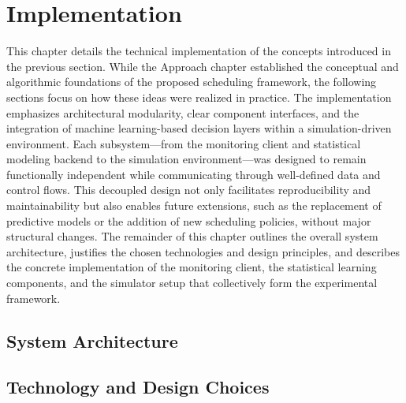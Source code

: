 \section{Implementation}
\label{cha:implementation}
This chapter details the technical implementation of the concepts introduced in the previous section. While the Approach chapter established the conceptual and algorithmic foundations of the proposed scheduling framework, the following sections focus on how these ideas were realized in practice. The implementation emphasizes architectural modularity, clear component interfaces, and the integration of machine learning-based decision layers within a simulation-driven environment. Each subsystem—from the monitoring client and statistical modeling backend to the simulation environment—was designed to remain functionally independent while communicating through well-defined data and control flows. This decoupled design not only facilitates reproducibility and maintainability but also enables future extensions, such as the replacement of predictive models or the addition of new scheduling policies, without major structural changes. The remainder of this chapter outlines the overall system architecture, justifies the chosen technologies and design principles, and describes the concrete implementation of the monitoring client, the statistical learning components, and the simulator setup that collectively form the experimental framework.

\subsection{System Architecture}
\label{sec:system_architecture}

\subsection{Technology and Design Choices}
\label{sec:technology_and_design_choices}

